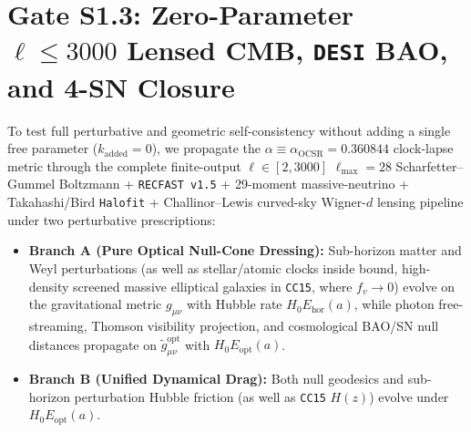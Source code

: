 \documentclass[11pt,a4paper]{article}
\begin{document}
\section{\texorpdfstring{Gate S1.3: Zero-Parameter $\ell \le 3000$ Lensed CMB, \texttt{DESI} BAO, and 4-SN Closure}{Gate S1.3: Zero-Parameter l <= 3000 Lensed CMB, DESI BAO, and 4-SN Closure}}
To test full perturbative and geometric self-consistency without adding a single free parameter ($k_{\mathrm{added}} = 0$), we propagate the $\alpha \equiv \alpha_{\mathrm{OCSR}} = 0.360844$ clock-lapse metric through the complete finite-output $\ell \in [2, 3000]$ $\ell_{\max}=28$ Scharfetter--Gummel Boltzmann + \texttt{RECFAST v1.5} + 29-moment massive-neutrino + Takahashi/Bird \texttt{Halofit} + Challinor--Lewis curved-sky Wigner-$d$ lensing pipeline under two perturbative prescriptions:
\begin{itemize}
    \item \textbf{Branch A (Pure Optical Null-Cone Dressing):} Sub-horizon matter and Weyl perturbations (as well as stellar/atomic clocks inside bound, high-density screened massive elliptical galaxies in \texttt{CC15}, where $f_v \to 0$) evolve on the gravitational metric $g_{\mu\nu}$ with Hubble rate $H_0 E_{\mathrm{hor}}(a)$, while photon free-streaming, Thomson visibility projection, and cosmological BAO/SN null distances propagate on $\tilde{g}_{\mu\nu}^{\mathrm{opt}}$ with $H_0 E_{\mathrm{opt}}(a)$.
    \item \textbf{Branch B (Unified Dynamical Drag):} Both null geodesics and sub-horizon perturbation Hubble friction (as well as \texttt{CC15} $H(z)$) evolve under $H_0 E_{\mathrm{opt}}(a)$.
\end{itemize}
\end{document}
